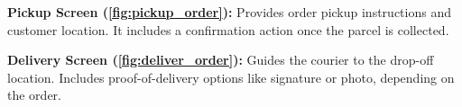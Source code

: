 \textbf{Pickup Screen (\ref{fig:pickup_order}):}  
Provides order pickup instructions and customer location. It includes a confirmation action once the parcel is collected.

\textbf{Delivery Screen (\ref{fig:deliver_order}):}  
Guides the courier to the drop-off location. Includes proof-of-delivery options like signature or photo, depending on the order.
